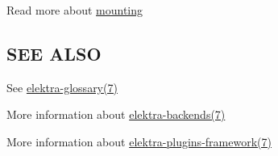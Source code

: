 Read more about \hyperlink{md_doc_help_elektra-mounting_doc_help_elektra-mounting_md}{mounting}

\subsection*{S\+E\+E A\+L\+S\+O}


\begin{DoxyItemize}
\item See \hyperlink{md_doc_help_elektra-glossary_doc_help_elektra-glossary_md}{elektra-\/glossary(7)}
\item More information about \hyperlink{md_doc_help_elektra-backends_doc_help_elektra-backends_md}{elektra-\/backends(7)}
\item More information about \hyperlink{md_doc_help_elektra-plugins-framework_doc_help_elektra-plugins-framework_md}{elektra-\/plugins-\/framework(7)} 
\end{DoxyItemize}